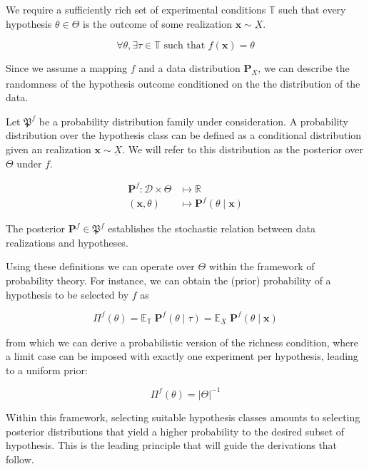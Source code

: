 \begin{definition}
    We require a
    sufficiently rich set of experimental conditions $\mathbb{T}$ such that every hypothesis $\theta \in \Theta$
    is the outcome of some realization $\bm{x} \sim \underbar{X}$.

    $$
    \forall \theta, \exists \tau \in \mathbb{T} \text{ such that } f(\bm{x}) = \theta
    $$
\end{definition}


Since we assume a mapping $f$ and a data distribution $\mathbf{P}_{\underbar{X}}$, we can describe
the randomness of the hypothesis outcome conditioned on the the distribution of the data.

\begin{definition}[Posterior]\label{def:posterior}
    Let $\mathfrak{P}^f$ be a probability distribution family under consideration.
    A probability distribution over the hypothesis class can be defined as a 
    conditional distribution given an realization $\bm{x} \sim \underbar{X}$. 
    We will refer to this distribution as the posterior over $\Theta$ under $f$.

    $$
        \begin{aligned}
            \mathbf{P}^f: \mathcal{D} \times \Theta & \longmapsto \mathbb{R} \\
            (\bm{x}, \theta) & \longmapsto \mathbf{P}^f (\theta \mid \bm{x})
        \end{aligned}
    $$

    The posterior $\mathbf{P}^f \in \mathfrak{P}^f$ establishes the stochastic relation between data realizations and hypotheses.
    
\end{definition}

Using these definitions we can operate over $\Theta$ within the framework of probability 
theory. For instance, we can obtain the (prior) probability of a hypothesis to be
selected by $f$ as

$$
 \Pi^f (\theta) = \mathbb{E}_{\mathbb{T}} \; \mathbf{P}^f (\theta \mid \tau) = \mathbb{E}_{\underline{X}} \; \mathbf{P}^f (\theta \mid \bm{x})
$$

from which we can derive a probabilistic version of the richness condition, where a limit
case can be imposed with exactly one experiment per hypothesis, leading to a uniform prior:

$$
\Pi^f (\theta) = |\Theta|^{-1}
$$

Within this framework, selecting suitable hypothesis classes amounts to selecting
posterior distributions that yield a higher probability to the desired subset of hypothesis. This
is the leading principle that will guide the derivations that follow.

